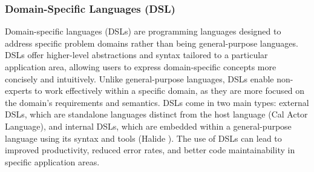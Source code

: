 


\subsubsection{Domain-Specific Languages (DSL)}
Domain-specific languages (DSLs) are programming languages designed to address specific problem domains rather than being general-purpose languages. DSLs offer higher-level abstractions and syntax tailored to a particular application area, allowing users to express domain-specific concepts more concisely and intuitively. Unlike general-purpose languages, DSLs enable non-experts to work effectively within a specific domain, as they are more focused on the domain's requirements and semantics. DSLs come in two main types: external DSLs, which are standalone languages distinct from the host language  (\eg Cal Actor Language\cite{Eker}), and internal DSLs, which are embedded within a general-purpose language using its syntax and tools (\eg Halide \cite{10.1145/2491956.2462176}). The use of DSLs can lead to improved productivity, reduced error rates, and better code maintainability in specific application areas.

